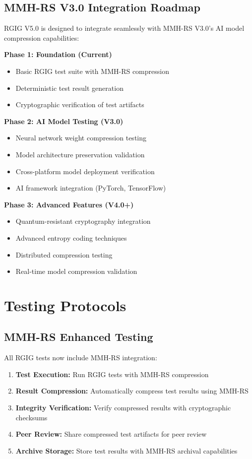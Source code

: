 \documentclass[11pt]{article}
\begin{document}
\subsection*{MMH-RS V3.0 Integration Roadmap}
RGIG V5.0 is designed to integrate seamlessly with MMH-RS V3.0's AI model compression capabilities:

\textbf{Phase 1: Foundation (Current)}
\begin{itemize}
  \item Basic RGIG test suite with MMH-RS compression
  \item Deterministic test result generation
  \item Cryptographic verification of test artifacts
\end{itemize}

\textbf{Phase 2: AI Model Testing (V3.0)}
\begin{itemize}
  \item Neural network weight compression testing
  \item Model architecture preservation validation
  \item Cross-platform model deployment verification
  \item AI framework integration (PyTorch, TensorFlow)
\end{itemize}

\textbf{Phase 3: Advanced Features (V4.0+)}
\begin{itemize}
  \item Quantum-resistant cryptography integration
  \item Advanced entropy coding techniques
  \item Distributed compression testing
  \item Real-time model compression validation
\end{itemize}

\section*{Testing Protocols}

\subsection*{MMH-RS Enhanced Testing}
All RGIG tests now include MMH-RS integration:

\begin{enumerate}
  \item \textbf{Test Execution:} Run RGIG tests with MMH-RS compression
  \item \textbf{Result Compression:} Automatically compress test results using MMH-RS
  \item \textbf{Integrity Verification:} Verify compressed results with cryptographic checksums
  \item \textbf{Peer Review:} Share compressed test artifacts for peer review
  \item \textbf{Archive Storage:} Store test results with MMH-RS archival capabilities
\end{enumerate}
\end{document}
